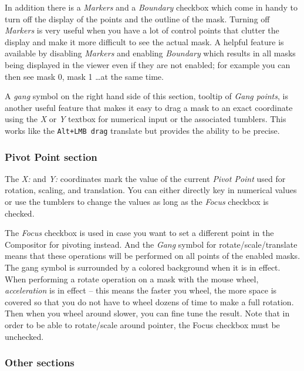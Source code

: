 In addition there is a \textit{Markers} and a \textit{Boundary} checkbox which come in handy to turn off the display of the points and the outline of the mask.  Turning off \textit{Markers} is very useful when you have a lot of control points that clutter the display and make it more difficult to see the actual mask.  A helpful feature is available by disabling \textit{Markers} and enabling \textit{Boundary} which results in all masks being displayed in the viewer
even if they are not enabled; for example you can then see mask 0, mask 1 \dots at the same time.

A \textit{gang} symbol on the right hand side of this section, tooltip of \textit{Gang points}, is another useful feature that makes it easy to drag a mask to an exact coordinate using the \textit{X} or \textit{Y} textbox for numerical input or the associated tumblers.  This works like the \texttt{Alt+LMB drag} translate but provides the ability to be precise.

\subsubsection*{Pivot Point section}%
\label{ssub:pivot_point_section}

The \textit{X:} and \textit{Y:} coordinates mark the value of the current \textit{Pivot Point} used for rotation, scaling, and translation.  You can either directly key in numerical values or use the tumblers to change the values as long as the \textit{Focus} checkbox is checked.

The \textit{Focus} checkbox is used in case you want to set a different point in the Compositor for pivoting instead.  And the \textit{Gang} symbol for rotate/scale/translate means that these operations will be performed on all points of the enabled masks.  The gang symbol is surrounded by a colored background when it is in effect.  When performing a rotate operation on a mask with the mouse wheel, \textit{acceleration} is in effect -- this means the faster you wheel, the more space is covered so that you do not have to wheel dozens of time to make a full rotation.  Then when you wheel around slower, you can fine tune the result.
Note that in order to be able to rotate/scale around pointer, the Focus checkbox must be unchecked.

\subsubsection*{Other sections}%
\label{ssub:other_sections}

